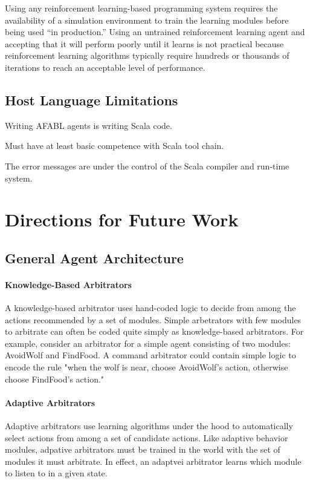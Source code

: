 Using any reinforcement learning-based programming system requires the availability of a simulation environment to train the learning modules before being used ``in production.'' Using an untrained reinforcement learning agent and accepting that it will perform poorly until it learns is not practical because reinforcement learning algorithms typically require hundreds or thousands of iterations to reach an acceptable level of performance.

\subsection{Host Language Limitations}

Writing AFABL agents is writing Scala code.

Must have at least basic competence with Scala tool chain.

The error messages are under the control of the Scala compiler and run-time system.

\section{Directions for Future Work}

\subsection{General Agent Architecture}


\paragraph{Knowledge-Based Arbitrators}

A knowledge-based arbitrator uses hand-coded logic to decide from
among the actions recommended by a set of modules.  Simple arbetrators
with few modules to arbitrate can often be coded quite simply as
knowledge-based arbitrators.  For example, consider an arbitrator for
a simple agent consisting of two modules: AvoidWolf and FindFood.  A
command arbitrator could contain simple logic to encode the rule "when
the wolf is near, choose AvoidWolf's action, otherwise choose
FindFood's action."


\paragraph{Adaptive Arbitrators}

Adaptive arbitrators use learning algorithms under the hood to
automatically select actions from among a set of candidate actions.
Like adaptive behavior modules, adpative arbitrators must be trained
in the world with the set of modules it must arbitrate.  In effect, an
adaptvei arbitrator learns which module to listen to in a given state.


